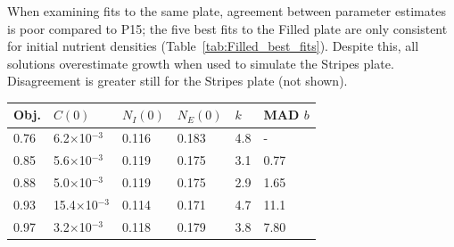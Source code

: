 \begin{multicols}{2}
When examining fits to the same plate, agreement between parameter
estimates is poor compared to P15; the five best fits to the Filled
plate are only consistent for initial nutrient densities
(Table~\ref{tab:Filled_best_fits}). Despite this, all solutions
overestimate growth when used to simulate the Stripes
plate. Disagreement is greater still for the Stripes plate (not
shown).
\begin{center}
  \begin{tabular}{l l l l l l}
    \hline
    Obj.  & \(C(0)\)                  & \(N_{I}(0)\) & \(N_{E}(0)\) & \(k\) & MAD \(b\)\\
    \hline
    0.76  & 6.2\(\times\)10\(^{-3}\)   & 0.116       & 0.183    & 4.8  & -    \\
    0.85  & 5.6\(\times\)10\(^{-3}\)   & 0.119       & 0.175    & 3.1  & 0.77 \\
    0.88  & 5.0\(\times\)10\(^{-3}\)   & 0.119       & 0.175    & 2.9  & 1.65 \\
    0.93  & 15.4\(\times\)10\(^{-3}\)  & 0.114       & 0.171    & 4.7  & 11.1 \\
    0.97  & 3.2\(\times\)10\(^{-3}\)   & 0.118       & 0.179    & 3.8  & 7.80 \\
    \hline
  \end{tabular}
  \label{tab:Filled_best_fits}
\end{center}



\end{multicols}
